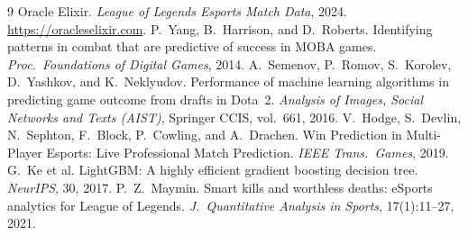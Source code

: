 \documentclass[sigconf,nonacm]{acmart}
\begin{document}
\begin{thebibliography}{9}
 Oracle Elixir. \emph{League of Legends Esports Match Data}, 2024.
  \url{https://oracleselixir.com}.
 P.~Yang, B.~Harrison, and D.~Roberts. Identifying patterns in combat that are
  predictive of success in MOBA games. \emph{Proc.\ Foundations of Digital Games}, 2014.
 A.~Semenov, P.~Romov, S.~Korolev, D.~Yashkov, and K.~Neklyudov. Performance
  of machine learning algorithms in predicting game outcome from drafts in Dota~2.
  \emph{Analysis of Images, Social Networks and Texts (AIST)}, Springer CCIS, vol.~661, 2016.
 V.~Hodge, S.~Devlin, N.~Sephton, F.~Block, P.~Cowling, and A.~Drachen. Win
  Prediction in Multi-Player Esports: Live Professional Match Prediction.
  \emph{IEEE Trans.\ Games}, 2019.
 G.~Ke et al. LightGBM: A highly efficient gradient boosting decision tree.
  \emph{NeurIPS}, 30, 2017.
 P.~Z.~Maymin. Smart kills and worthless deaths: eSports analytics for League
  of Legends. \emph{J.\ Quantitative Analysis in Sports}, 17(1):11--27, 2021.
\end{thebibliography}
\end{document}
